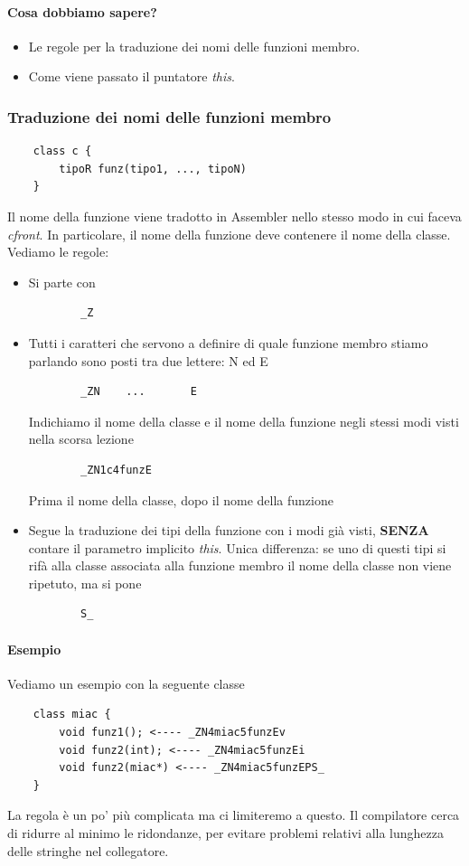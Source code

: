 \paragraph{Cosa dobbiamo sapere?}
\begin{itemize}
	\item Le regole per la traduzione dei nomi delle funzioni membro.
	\item Come viene passato il puntatore \emph{this}.
\end{itemize}

\subsubsection{Traduzione dei nomi delle funzioni membro}
\begin{verbatim}
	class c {
		tipoR funz(tipo1, ..., tipoN)
	}
\end{verbatim}
Il nome della funzione viene tradotto in Assembler nello stesso modo in cui faceva \emph{cfront}. In particolare, il nome della funzione deve contenere il nome della classe. Vediamo le regole:
\begin{itemize}
	\item Si parte con
	\begin{verbatim}
		_Z
	\end{verbatim}
	\item Tutti i caratteri che servono a definire di quale funzione membro stiamo parlando sono posti tra due lettere: N ed E
	\begin{verbatim}
		_ZN    ...       E
	\end{verbatim}
	Indichiamo il nome della classe e il nome della funzione negli stessi modi visti nella scorsa lezione
	\begin{verbatim}
		_ZN1c4funzE
	\end{verbatim}
	Prima il nome della classe, dopo il nome della funzione
	\item Segue la traduzione dei tipi della funzione con i modi già visti, \textbf{SENZA} contare il parametro implicito \emph{this}. Unica differenza: se uno di questi tipi si rifà alla classe associata alla funzione membro il nome della classe non viene ripetuto, ma si pone
	\begin{verbatim}
		S_
	\end{verbatim}
\end{itemize}
\paragraph{Esempio} Vediamo un esempio con la seguente classe
\begin{verbatim}
	class miac {
		void funz1(); <---- _ZN4miac5funzEv
		void funz2(int); <---- _ZN4miac5funzEi
		void funz2(miac*) <---- _ZN4miac5funzEPS_
	}
\end{verbatim}
La regola è un po' più complicata ma ci limiteremo a questo. Il compilatore cerca di ridurre al minimo le ridondanze, per evitare problemi relativi alla lunghezza delle stringhe nel collegatore.
